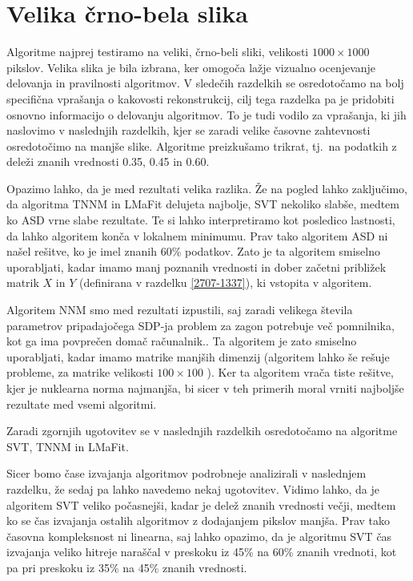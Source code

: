 \section{Velika črno-bela slika} \label{1307-2250}
Algoritme najprej testiramo na veliki, črno-beli sliki, velikosti $1000\times1000$ pikslov. Velika slika je bila izbrana, ker omogoča lažje vizualno ocenjevanje delovanja in pravilnosti algoritmov.
V sledečih razdelkih se osredotočamo na bolj specifična vprašanja o kakovosti rekonstrukcij, cilj tega razdelka pa je pridobiti osnovno informacijo o delovanju algoritmov. 
To je tudi vodilo za vprašanja, ki
jih naslovimo v naslednjih razdelkih, kjer
se zaradi velike časovne zahtevnosti osredotočimo na manjše slike. Algoritme preizkušamo trikrat, tj.\ na podatkih z deleži znanih vrednosti 0.35, 0.45  in 0.60.


\FloatBarrier


Opazimo lahko, da je med rezultati velika razlika. Že na pogled lahko zaključimo, da algoritma TNNM in LMaFit delujeta najbolje, SVT nekoliko slabše, medtem ko
ASD vrne slabe rezultate. Te si lahko interpretiramo kot posledico lastnosti, da lahko algoritem konča v lokalnem minimumu. Prav tako algoritem ASD ni našel rešitve, ko je imel znanih 60\% podatkov. Zato je ta algoritem smiselno uporabljati, kadar imamo manj poznanih vrednosti in dober začetni približek matrik $X$ in $Y$ (definirana v razdelku \ref{2707-1337}), ki vstopita v algoritem.

Algoritem NNM smo med rezultati izpustili, saj zaradi velikega števila parametrov pripadajočega SDP-ja problem za zagon potrebuje več pomnilnika, kot ga ima povprečen domač računalnik.. Ta algoritem je zato smiselno uporabljati, kadar imamo matrike manjših dimenzij (algoritem lahko še rešuje probleme, za matrike velikosti $100 \times 100$ \cite{NNM-Candes}). 
Ker ta algoritem vrača tiste rešitve, kjer je nuklearna norma najmanjša, bi sicer v teh primerih moral vrniti najboljše rezultate med vsemi algoritmi. 

Zaradi zgornjih ugotovitev se v naslednjih razdelkih osredotočamo na algoritme SVT, TNNM in LMaFit.

Sicer bomo čase izvajanja algoritmov podrobneje analizirali v naslednjem razdelku, že sedaj pa lahko navedemo nekaj ugotovitev. Vidimo lahko, da je algoritem SVT veliko počasnejši, kadar je delež znanih vrednosti večji, medtem ko se čas izvajanja ostalih algoritmov z dodajanjem pikslov manjša. Prav tako časovna kompleksnost ni linearna, saj lahko opazimo, da je algoritmu SVT čas izvajanja veliko hitreje naraščal v preskoku iz 45\% na 60\% znanih vrednoti, kot pa pri preskoku iz 35\% na 45\% znanih vrednosti.

